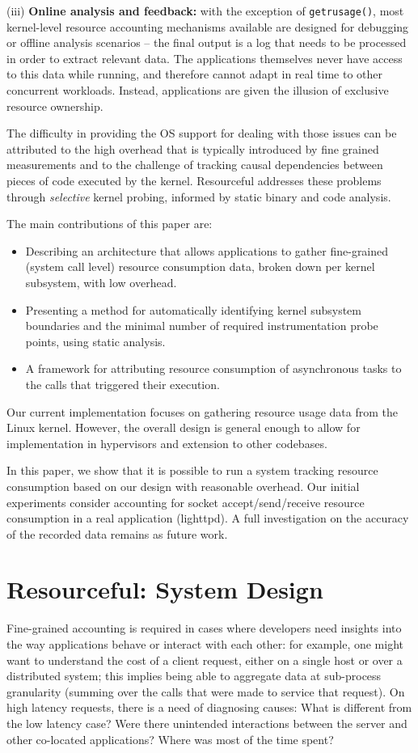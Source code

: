 \documentclass[letterpaper,twocolumn,10pt]{article}
\newcommand{\pname}{Resourceful}
\begin{document}
(iii) \textbf{Online analysis and feedback:} with the exception of
\texttt{getrusage()}, most kernel-level resource accounting mechanisms available
are designed for debugging or offline analysis scenarios -- the final output is
a log that needs to be processed in order to extract relevant data. The
applications themselves never have access to this data while running, and
therefore cannot adapt in real time to other concurrent workloads. Instead,
applications are given the illusion of exclusive resource ownership.

The difficulty in providing the OS support for dealing with those issues can be
attributed to the high overhead that is typically introduced by fine grained
measurements and to the challenge of tracking causal dependencies between pieces
of code executed by the kernel. \pname{ }addresses these problems through
\emph{selective} kernel probing, informed by static binary and code analysis.

The main contributions of this paper are: 

\begin{itemize} 
\item Describing an architecture that allows applications to gather fine-grained
(system call level) resource consumption data, broken down per kernel subsystem,
with low overhead.
\item Presenting a method for automatically identifying kernel subsystem
boundaries and the minimal number of required instrumentation probe points,
using static analysis.
\item A framework for attributing resource consumption of asynchronous
tasks to the calls that triggered their execution.
\end{itemize}

Our current implementation focuses on gathering resource usage data from the
Linux kernel.  However, the overall design is general enough to allow for
implementation in hypervisors and extension to other codebases. 

In this paper, we show that it is possible to run a system tracking resource
consumption based on our design with reasonable overhead. Our initial experiments
consider accounting for socket accept/send/receive resource consumption in a
real application (lighttpd). A full investigation on the accuracy of the
recorded data remains as future work.


\section{\pname: System Design} 
Fine-grained accounting is required in cases where developers need insights into the way applications behave or interact with each other: for example, one might want to understand the cost of a client request, either on a single host or over a distributed system; this implies being able to aggregate data at sub-process granularity (summing over the calls that were made to service that request). On high latency requests, there is a need of diagnosing causes: What is different from the low latency case? Were there unintended interactions between the server and other co-located applications? Where was most of the time spent?
\end{document}
